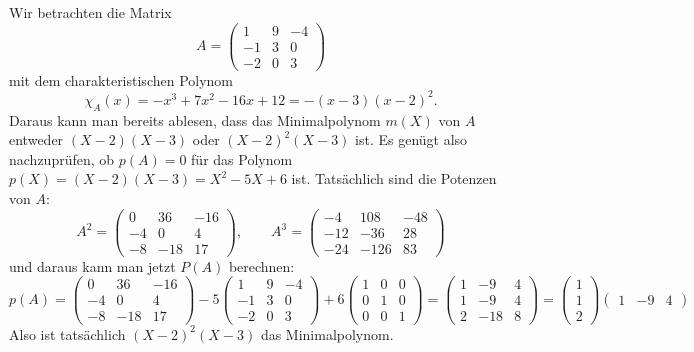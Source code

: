 \begin{beispiel}
Wir betrachten die Matrix
\[
A
=
\begin{pmatrix}
   1&  9& -4\\
  -1&  3&  0\\
  -2&  0&  3
\end{pmatrix}
\]
mit dem charakteristischen Polynom
\[
\chi_A(x)
=
-x^3+7x^2-16 x+12
=
-(x-3)(x-2)^2.
\]
Daraus kann man bereits ablesen, dass das Minimalpolynom $m(X)$ von $A$ 
entweder $(X-2)(X-3)$ oder $(X-2)^2(X-3)$ ist.
Es genügt also nachzuprüfen, ob $p(A)=0$ für das Polynom
$p(X)=(X-2)(X-3) = X^2-5X+6$ ist.
Tatsächlich sind die Potenzen von $A$:
\[
A^2=
\begin{pmatrix}
  0&  36& -16 \\
 -4&   0&   4 \\
 -8& -18&  17 
\end{pmatrix}
,\qquad
A^3=
\begin{pmatrix}
 -4& 108& -48\\
-12& -36&  28\\
-24&-126&  83
\end{pmatrix}
\]
und daraus kann man jetzt $P(A)$ berechnen:
\begin{equation}
p(A)
=
\begin{pmatrix}
  0&  36& -16 \\
 -4&   0&   4 \\
 -8& -18&  17 
\end{pmatrix}
-5
\begin{pmatrix}
   1&  9& -4\\
  -1&  3&  0\\
  -2&  0&  3
\end{pmatrix}
+
6
\begin{pmatrix}
1&0&0\\
0&1&0\\
0&0&1
\end{pmatrix}
=
\begin{pmatrix}
   1& -9&  4\\
   1& -9&  4\\
   2&-18&  8
\end{pmatrix}
=
\begin{pmatrix}1\\1\\2\end{pmatrix}
\begin{pmatrix}1&-9&4\end{pmatrix}
\label{buch:eigenwerte:eqn:nichtminimalpolynom}
\end{equation}
Also ist tatsächlich $(X-2)^2(X-3)$ das Minimalpolynom.


\end{beispiel}
